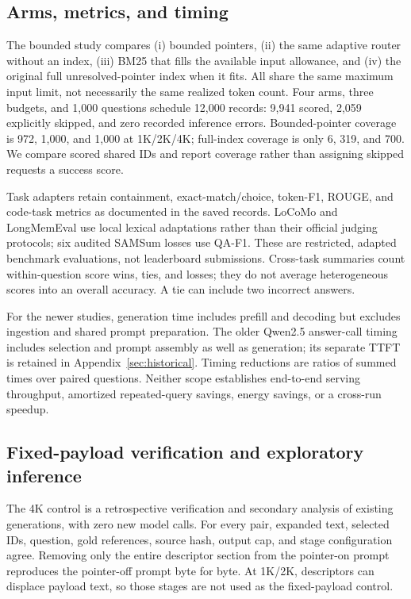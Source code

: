 \documentclass[runningheads]{llncs}
\begin{document}
\subsection{Arms, metrics, and timing}
The bounded study compares (i) bounded pointers, (ii) the same adaptive router without an index, (iii) BM25 that fills the available input allowance, and (iv) the original full unresolved-pointer index when it fits. All share the same maximum input limit, not necessarily the same realized token count. Four arms, three budgets, and 1,000 questions schedule 12,000 records: 9,941 scored, 2,059 explicitly skipped, and zero recorded inference errors. Bounded-pointer coverage is 972, 1,000, and 1,000 at 1K/2K/4K; full-index coverage is only 6, 319, and 700. We compare scored shared IDs and report coverage rather than assigning skipped requests a success score.

Task adapters retain containment, exact-match/choice, token-F1, ROUGE, and code-task metrics as documented in the saved records. LoCoMo and LongMemEval use local lexical adaptations rather than their official judging protocols; six audited SAMSum losses use QA-F1. These are restricted, adapted benchmark evaluations, not leaderboard submissions. Cross-task summaries count within-question score wins, ties, and losses; they do not average heterogeneous scores into an overall accuracy. A tie can include two incorrect answers.

For the newer studies, generation time includes prefill and decoding but excludes ingestion and shared prompt preparation. The older Qwen2.5 answer-call timing includes selection and prompt assembly as well as generation; its separate TTFT is retained in Appendix~\ref{sec:historical}. Timing reductions are ratios of summed times over paired questions. Neither scope establishes end-to-end serving throughput, amortized repeated-query savings, energy savings, or a cross-run speedup.

\subsection{Fixed-payload verification and exploratory inference}
The 4K control is a retrospective verification and secondary analysis of existing generations, with zero new model calls. For every pair, expanded text, selected IDs, question, gold references, source hash, output cap, and stage configuration agree. Removing only the entire descriptor section from the pointer-on prompt reproduces the pointer-off prompt byte for byte. At 1K/2K, descriptors can displace payload text, so those stages are not used as the fixed-payload control.
\end{document}
